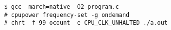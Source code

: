 
\begin{verbatim}
   $ gcc -march=native -O2 program.c
   # cpupower frequency-set -g ondemand
   # chrt -f 99 ocount -e CPU_CLK_UNHALTED ./a.out
\end{verbatim}



